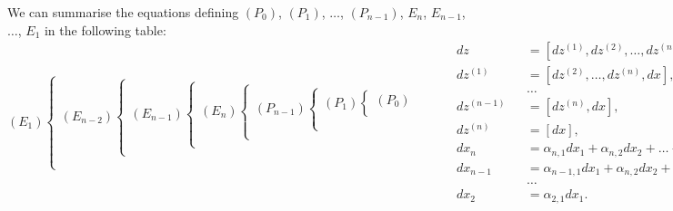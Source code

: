\documentclass[leqno,11pt]{book}
\theoremstyle{shape1}
\theoremstyle{shapesmall}
\begin{document}
We can summarise the equations defining $(P_{0})$, $(P_{1})$, $\dots$, $(P_{n-1})$, $E_{n}$, $E_{n-1}$, $\dots$, $E_{1}$ in the following table:
{\scriptsize
  \[
  (E_{1})
  \left\{
    \begin{gathered}  
      (E_{n-2})
      \left\{
        \begin{gathered}  
          (E_{n-1})
          \left\{
            \begin{gathered}  
              (E_{n})
              \left\{
                \begin{gathered}  
                  (P_{n-1})
                  \left\{
                    \begin{gathered}
                      (P_{1})
                      \left\{
                        \begin{gathered}
                          (P_{0})\\
                          \,
                        \end{gathered}
                      \right.\\
                      \,\\
                      \,
                    \end{gathered}
                  \right.\\
                  \,
                \end{gathered}
              \right.\\
              \,
            \end{gathered}
          \right.\\
          \,
        \end{gathered}
      \right.\\
      \,\\
      \,
    \end{gathered}
  \right.
  \begin{alignedat}{4}
    &dz&&=[dz^{(1)},dz^{(2)},\dots,dz^{(n)},dx],\\
    &dz^{(1)}&&=[dz^{(2)},\dots,dz^{(n)},dx],\\
    &&&\dots\\
    &dz^{(n-1)}&&=[dz^{(n)},dx],\\
    &dz^{(n)}&&=[dx],\\
    &dx_{n}&&=\alpha_{n,1}dx_{1}+\alpha_{n,2}dx_{2}+\dots+\alpha_{n,n-1}dx_{n-1},\\
    &dx_{n-1}&&=\alpha_{n-1,1}dx_{1}+\alpha_{n,2}dx_{2}+\dots+\alpha_{n-1,n-2}dx_{n-2},\\
    &&&\dots\\
    &dx_{2}&&=\alpha_{2,1}dx_{1}.
  \end{alignedat}
  \]
}
\end{document}
